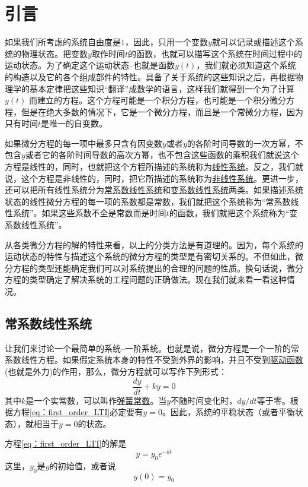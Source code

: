 
\chapter{引言}

如果我们所考虑的系统自由度是$1$，因此，只用一个变数$y$就可以记录或描述这个系统的物理状态。把变数$y$取作时间$t$的函数，也就可以描写这个系统在时间过程中的运动状态。为了确定这个运动状态--也就是函数$y(t)$，我们就必须知道这个系统的构造以及它的各个组成部件的特性。具备了关于系统的这些知识之后，再根据物理学的基本定律把这些知识“翻译”成数学的语言，这样我们就得到一个为了计算 $y(t)$ 而建立的方程。这个方程可能是一个积分方程，也可能是一个积分微分方程，但是在绝大多数的情况下，它是一个微分方程，而且是一个常微分方程，因为只有时间$t$是唯一的自变数。

如果微分方程的每一项中最多只含有因变数$y$或者$y$的各阶时间导数的一次方幂，不包含$y$或者它的各阶时间导数的高次方幂，也不包含这些函数的乘积我们就说这个方程是线性的，同时，也就把这个方程所描述的系统称为\underline{线性系统}。反之，我们就说，这个方程是非线性的，同时，把它所描述的系统称为\underline{非线性系统}。更进一步，还可以把所有线性系统分为\underline{常系数线性系统}和\underline{变系数线性系统}两类。如果描述系统状态的线性微分方程的每一项的系数都是常数，我们就把这个系统称为“常系数线性系统”。如果这些系数不全是常数而是时间$t$的函数，我们就把这个系统称为“变系数线性系统”。

从各类微分方程的解的特性来看，以上的分类方法是有道理的。因为，每个系统的运动状态的特性与描述这个系统的微分方程的类型是有密切关系的。不但如此，微分方程的类型还能确定我们可以对系统提出的合理的问题的性质。换句话说，微分方程的类型确定了解决系统的工程问题的正确做法。现在我们就来看一看这种情况。

\section{常系数线性系统}

让我们来讨论一个最简单的系统--一阶系统。也就是说，微分方程是一个一阶的常系数线性方程。如果假定系统本身的特性不受到外界的影响，并且不受到\underline{驱动函数}(也就是外力)的作用，那么，微分方程就可以写作下列形式：
\begin{equation}\label{eq：first_order_LTI}
\frac{dy}{dt}+ky=0
\end{equation}
其中$k$是一个实常数，可以叫作\underline{弹簧常数}。当$y$不随时间变化时，$dy/dt$等于零。根据方程\eqref{eq：first_order_LTI}必定要有$y=0$。因此，系统的平稳状态（或者平衡状态），就相当于$y=0$的状态。

方程\eqref{eq：first_order_LTI}的解是
\begin{equation}\label{eq：solution_of_first_order_LTI}
y=y_0 e^{-kt}
\end{equation}
这里，$y_0$是$y$的初始值，或者说
\begin{equation}
y(0)=y_0
\end{equation}

